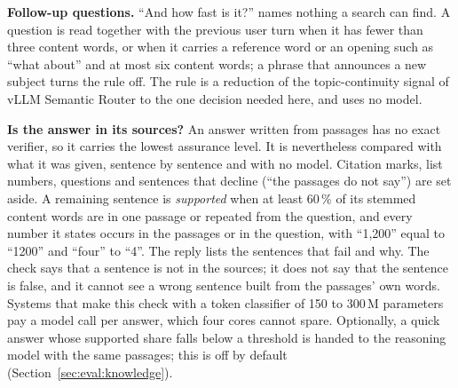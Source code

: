 \textbf{Follow-up questions.} ``And how fast is it?'' names nothing a search
can find. A question is read together with the previous user turn when it has
fewer than three content words, or when it carries a reference word or an
opening such as ``what about'' and at most six content words; a phrase that
announces a new subject turns the rule off. The rule is a reduction of the
topic-continuity signal of vLLM Semantic Router \cite{semanticrouter2026} to
the one decision needed here, and uses no model.

\textbf{Is the answer in its sources?} An answer written from passages has no
exact verifier, so it carries the lowest assurance level. It is nevertheless
compared with what it was given, sentence by sentence and with no model.
Citation marks, list numbers, questions and sentences that decline (``the
passages do not say'') are set aside. A remaining sentence is \emph{supported}
when at least 60\,\% of its stemmed content words are in one passage or
repeated from the question, and every number it states occurs in the passages
or in the question, with ``1{,}200'' equal to ``1200'' and ``four'' to
``4''. The reply lists the sentences that
fail and why. The check says that a sentence is not in the sources; it does
not say that the sentence is false, and it cannot see a wrong sentence built
from the passages' own words. Systems that make this check with a token
classifier of 150 to 300\,M parameters \cite{semanticrouter2026} pay a model
call per answer, which four cores cannot spare. Optionally, a quick answer
whose supported share falls below a threshold is handed to the reasoning
model with the same passages; this is off by default
(Section~\ref{sec:eval:knowledge}).
